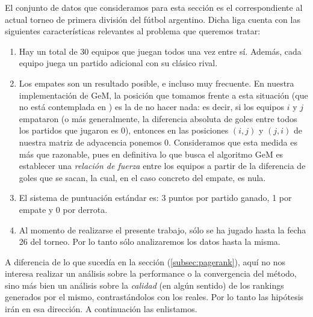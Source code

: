 El conjunto de datos que consideramos para esta sección es el correspondiente al actual torneo de primera división del fútbol argentino. Dicha liga cuenta con las siguientes características relevantes al problema que queremos tratar:
\begin{enumerate}
	\item Hay un total de 30 equipos que juegan todos una vez entre sí. Además, cada equipo juega un partido adicional con su clásico rival.
	\item Los empates son un resultado posible, e incluso muy frecuente. En nuestra implementación de GeM, la posición que tomamos frente a esta situación (que no está contemplada en \cite{Govan2008}) es la de no hacer nada: es decir, si los equipos $i$ y $j$ empataron (o más generalmente, la diferencia absoluta de goles entre todos los partidos que jugaron es 0), entonces en las posiciones $(i,j)$ y $(j,i)$ de nuestra matriz de adyacencia ponemos 0. Consideramos que esta medida es más que razonable, pues en definitiva lo que busca el algoritmo GeM es establecer una \emph{relación de fuerza} entre los equipos a partir de la diferencia de goles que se sacan, la cual, en el caso concreto del empate, es nula. 
	\item El sistema de puntuación estándar es: 3 puntos por partido ganado, 1 por empate y 0 por derrota.
	\item Al momento de realizarse el presente trabajo, sólo se ha jugado hasta la fecha 26 del torneo. Por lo tanto sólo analizaremos los datos hasta la misma. 
\end{enumerate} 

A diferencia de lo que sucedía en la sección (\ref{subsec:pagerank}), aquí no nos interesa realizar un análisis sobre la performance o la convergencia del método, sino más bien un análisis sobre la \emph{calidad} (en algún sentido) de los rankings generados por el mismo, contrastándolos con los reales. Por lo tanto las hipótesis irán en esa dirección. A continuación las enlistamos.

